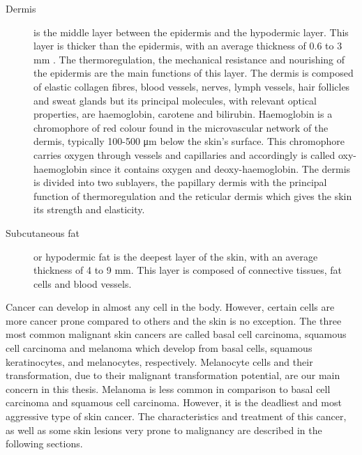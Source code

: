\begin{description}
\item[Dermis] is the middle layer between the epidermis and the hypodermic layer.
This layer is thicker than the epidermis, with an average thickness of 0.6 to 3 mm \cite{anderson1981optics}. 
The thermoregulation, the mechanical resistance and nourishing of the epidermis are the main functions of this layer. 
The dermis is composed of elastic collagen fibres, blood vessels, nerves, lymph vessels, hair follicles and sweat glands but its principal molecules, with relevant optical properties, are haemoglobin, carotene and bilirubin. 
Haemoglobin is a chromophore of red colour found in the microvascular network of the dermis, typically 100-500 \si{\micro\meter} below the skin's surface. 
This chromophore carries oxygen through vessels and capillaries and accordingly is called oxy-haemoglobin since it contains oxygen and deoxy-haemoglobin. 
The dermis is divided into two sublayers, the papillary dermis with the principal function of thermoregulation and the reticular dermis which gives the skin its strength and elasticity. 

\item[Subcutaneous fat] or hypodermic fat is the deepest layer of the skin, with an average thickness of 4 to 9 mm. 
This layer is composed of connective tissues, fat cells and blood vessels. 

\end{description}

	



Cancer can develop in almost any cell in the body. 
However, certain cells are more cancer prone compared to others and the skin is no exception. 
The three most common malignant skin cancers are called basal cell carcinoma, squamous cell carcinoma and melanoma which develop from basal cells, squamous keratinocytes, and melanocytes, respectively. 
Melanocyte cells and their transformation, due to their malignant transformation potential, are our main concern in this thesis. 
Melanoma is less common in comparison to basal cell carcinoma and squamous cell carcinoma.
However, it is the deadliest and most aggressive type of skin cancer. 
The characteristics and treatment of this cancer, as well as some skin lesions very prone to malignancy are described in the following sections.


